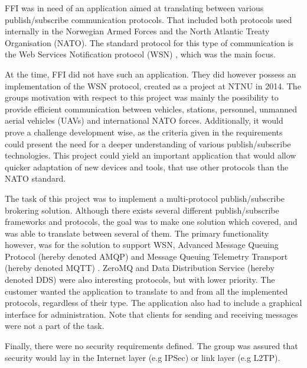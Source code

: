 FFI was in need of an application aimed at translating between various publish/subscribe communication protocols. That included both protocols used internally in the Norwegian Armed Forces and the North Atlantic Treaty Organisation (NATO). The standard protocol for this type of communication is the Web Services Notification protocol (WSN) \cite{wsn-complete}, which was the main focus.

At the time, FFI did not have such an application. They did however possess an implementation of the WSN protocol, created as a project at NTNU in 2014. The groups motivation with respect to this project was mainly the possibility to provide efficient communication between vehicles, stations, personnel, unmanned aerial vehicles (UAVs) and international NATO forces. Additionally, it would prove a challenge development wise, as the criteria given in the requirements could present the need for a  deeper understanding of various publish/subscribe technologies. This project could yield an important application that would allow quicker adaptation of new devices and tools, that use other protocols than the NATO standard.

The task of this project was to implement a multi-protocol publish/subscribe brokering solution. Although there exists several different publish/subscribe frameworks and protocols, the goal was to make one solution which covered, and was able to translate between several of them. The primary functionality however, was for the solution to support WSN, Advanced Message Queuing Protocol (hereby denoted AMQP) \cite{amqp} and Message Queuing Telemetry Transport (hereby denoted MQTT) \cite{mqtt}. ZeroMQ \cite{zero-mq} and Data Distribution Service (hereby denoted DDS) \cite{dds} were also interesting protocols, but with lower priority. The customer wanted the application to translate to and from all the implemented protocols, regardless of their type. The application also had to include a graphical interface for administration. Note that clients for sending and receiving messages were not a part of the task.

Finally, there were no security requirements defined. The group was assured that security would lay in the Internet layer (e.g IPSec) or link layer (e.g L2TP).


\clearpage
